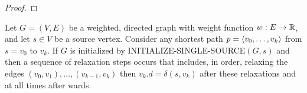\documentclass[11pt]{article}
\begin{document}
\begin{proof}

\end{proof}

\begin{lemma}
Let \(G=(V,E)\) be a weighted, directed graph with weight function \(w:E\to\mathbb{R}\), and let \(s\in V\)
be a source vertex. Consider any shortest path \(p=\langle v_0,\dots,v_k\rangle\) from \(s=v_0\) to \(v_k\).
If \(G\) is initialized by INITIALIZE-SINGLE-SOURCE\((G,s)\) and then a sequence of relaxation
steps occurs that includes, in order, relaxing the edges \((v_0,v_1),\dots,(v_{k-1},v_k)\)
then \(v_k.d=\delta(s,v_k)\) after these relaxations and at all times after wards.
\end{lemma}
\end{document}
